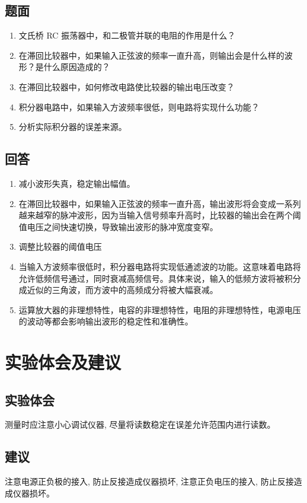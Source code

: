 \documentclass[10pt, a4paper]{article} %
\begin{document}
\subsection{题面}
\begin{enumerate}[leftmargin=50pt,label=(\arabic*)] %
    \item 文氏桥 RC 振荡器中，和二极管并联的电阻的作用是什么？
    \item 在滞回比较器中，如果输入正弦波的频率一直升高，则输出会是什么样的波形？是什么原因造成的？
    \item 在滞回比较器中，如何修改电路使比较器的输出电压改变？
    \item 积分器电路中，如果输入方波频率很低，则电路将实现什么功能？
    \item 分析实际积分器的误差来源。

\end{enumerate}
\subsection{回答}

\begin{enumerate}[leftmargin=50pt,label=(\arabic*)] %
    \item 减小波形失真，稳定输出幅值。
    \item 在滞回比较器中，如果输入正弦波的频率一直升高，输出波形将会变成一系列越来越窄的脉冲波形，因为当输入信号频率升高时，比较器的输出会在两个阈值电压之间快速切换，导致输出波形的脉冲宽度变窄。
    \item 调整比较器的阈值电压
    \item 当输入方波频率很低时，积分器电路将实现低通滤波的功能。这意味着电路将允许低频信号通过，同时衰减高频信号。具体来说，输入的低频方波将被积分成近似的三角波，而方波中的高频成分将被大幅衰减。
    \item 运算放大器的非理想特性，电容的非理想特性，电阻的非理想特性，电源电压的波动等都会影响输出波形的稳定性和准确性。
\end{enumerate}

\section{实验体会及建议}
\subsection{实验体会}
测量时应注意小心调试仪器, 尽量将读数稳定在误差允许范围内进行读数。
\subsection{建议}
注意电源正负极的接入, 防止反接造成仪器损坏, 注意正负电压的接入, 防止反接造成仪器损坏。
\end{document}
